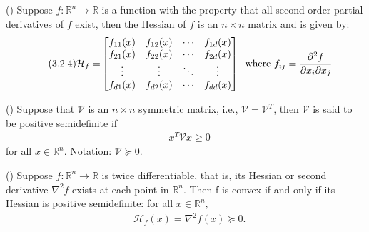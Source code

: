 \begin{definition}[Hessian]
(\cite[748]{adams2013calculus})
Suppose $f: \mathbb{R}^{n} \longrightarrow \mathbb{R}$ is a function with the property that all second-order partial derivatives of $f$ exist, then the Hessian of $f$ is an $n \times n$ matrix and is given by:
\begin{equation*}\tag{3.2.4}
\begin{aligned}
\mathcal{H}_{f} =
& \begin{bmatrix}
    f_{11}(x) & f_{12}(x) & \cdots & f_{1d}(x) \\
    f_{21}(x) & f_{22}(x) & \cdots & f_{2d}(x) \\
    \vdots    & \vdots    & \ddots & \vdots    \\
    f_{d1}(x) & f_{d2}(x) & \cdots & f_{dd}(x)
  \end{bmatrix}
  \hspace{0.2cm}
  \text{where}\text{ } f_{ij} = \frac{\partial^{2}f}{\partial x_{i}\partial x_{j}}
\end{aligned}
\end{equation*}
\end{definition}
\begin{definition}\label{posdef}
(\cite{doi:https://doi.org/10.1002/9780470173862.app3})
Suppose that $\mathcal{V}$ is an $n \times n$ symmetric matrix, i.e., $\mathcal{V}=\mathcal{V}^{T}$, then $\mathcal{V}$ is said to be positive semidefinite if 
\begin{equation*}\label{eq:6}\tag{3.2.5}
\begin{aligned}
    &x^{T} \mathcal{V} x \geq 0 
\end{aligned}
\end{equation*}
for all $x \in \mathbb{R}^{n}$. Notation: $\mathcal{V} \succeq 0.$
\end{definition}
\begin{lemma}\label{second-ord-cond}
\textnormal{(\cite[71]{boyd2004convex})}
Suppose $f:\mathbb{R}^{n}\longrightarrow\mathbb{R}$ is twice differentiable, that is, its Hessian or second derivative $\nabla^{2}f$ exists at each point in $\mathbb{R}^{n}$. Then f is convex if and only if its Hessian is positive semidefinite: for all $x \in \mathbb{R}^{n},$ 
\begin{equation*}\label{eq:9}\tag{3.2.6}
\begin{aligned}
    &\mathcal{H}_{f}(x)=\nabla^{2}f(x) \succeq 0.
\end{aligned}
\end{equation*}
\end{lemma}
